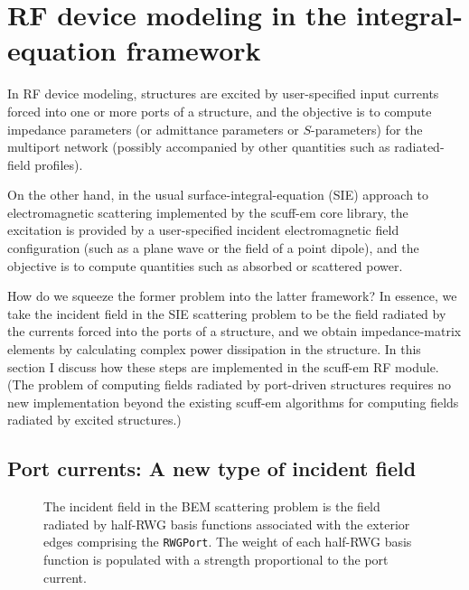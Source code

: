 \documentclass[letterpaper]{article}
\begin{document}
\section{RF device modeling in the integral-equation framework}
\label{RFDeviceModeling}

In RF device modeling, structures are excited by user-specified input currents
forced into one or more ports of a structure, and the objective is to compute
impedance parameters (or admittance parameters or $S$-parameters) for the 
multiport network (possibly accompanied by other quantities such as 
radiated-field profiles).

On the other hand, in the usual surface-integral-equation (SIE)
approach to electromagnetic scattering implemented by the {\sc scuff-em}
core library, the excitation is provided by a user-specified
incident electromagnetic field configuration (such as a plane wave
or the field of a point dipole),
and the objective is to compute quantities such as absorbed or scattered
power.

How do we squeeze the former problem into the latter framework?
In essence, we take the incident field in the SIE scattering problem
to be the field radiated by the currents forced into the ports
of a structure, and we obtain impedance-matrix elements by calculating
complex power dissipation in the structure.
In this section I discuss how these steps are implemented
in the {\sc scuff-em} RF module.
(The problem of computing fields radiated by port-driven structures
requires no new implementation beyond the existing {\sc scuff-em} 
algorithms for computing fields radiated by excited structures.)

\subsection{Port currents: A new type of incident field}

\begin{figure}
\begin{center}
\caption{The incident field in the BEM scattering problem
         is the field radiated by half-RWG basis functions
         associated with the exterior edges comprising the
         \texttt{RWGPort}.
         The weight of each
half-RWG basis function is populated with
         a strength proportional to the port current.
        }
\label{PortCurrentFigure}
\end{center}
\end{figure}
\end{document}
